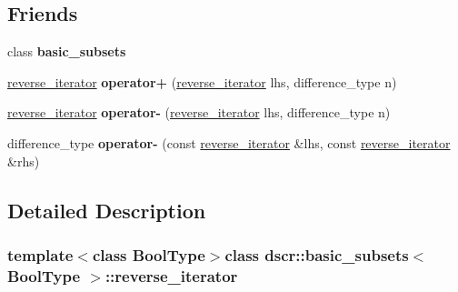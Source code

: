 \subsection*{Friends}
\begin{DoxyCompactItemize}
\item 
\hypertarget{classdscr_1_1basic__subsets_1_1reverse__iterator_a6cf8333f0bc6a559385b55c16b45e772}{class {\bfseries basic\-\_\-subsets}}\label{classdscr_1_1basic__subsets_1_1reverse__iterator_a6cf8333f0bc6a559385b55c16b45e772}

\item 
\hypertarget{classdscr_1_1basic__subsets_1_1reverse__iterator_a2c7fdd81f663381e951fb677763da73a}{\hyperlink{classdscr_1_1basic__subsets_1_1reverse__iterator}{reverse\-\_\-iterator} {\bfseries operator+} (\hyperlink{classdscr_1_1basic__subsets_1_1reverse__iterator}{reverse\-\_\-iterator} lhs, difference\-\_\-type n)}\label{classdscr_1_1basic__subsets_1_1reverse__iterator_a2c7fdd81f663381e951fb677763da73a}

\item 
\hypertarget{classdscr_1_1basic__subsets_1_1reverse__iterator_ad23e7d190001b7e889291da869e0e825}{\hyperlink{classdscr_1_1basic__subsets_1_1reverse__iterator}{reverse\-\_\-iterator} {\bfseries operator-\/} (\hyperlink{classdscr_1_1basic__subsets_1_1reverse__iterator}{reverse\-\_\-iterator} lhs, difference\-\_\-type n)}\label{classdscr_1_1basic__subsets_1_1reverse__iterator_ad23e7d190001b7e889291da869e0e825}

\item 
\hypertarget{classdscr_1_1basic__subsets_1_1reverse__iterator_a46fe9efd66cb5e2a2e89a93f2e060b82}{difference\-\_\-type {\bfseries operator-\/} (const \hyperlink{classdscr_1_1basic__subsets_1_1reverse__iterator}{reverse\-\_\-iterator} \&lhs, const \hyperlink{classdscr_1_1basic__subsets_1_1reverse__iterator}{reverse\-\_\-iterator} \&rhs)}\label{classdscr_1_1basic__subsets_1_1reverse__iterator_a46fe9efd66cb5e2a2e89a93f2e060b82}

\end{DoxyCompactItemize}


\subsection{Detailed Description}
\subsubsection*{template$<$class Bool\-Type$>$class dscr\-::basic\-\_\-subsets$<$ Bool\-Type $>$\-::reverse\-\_\-iterator}

